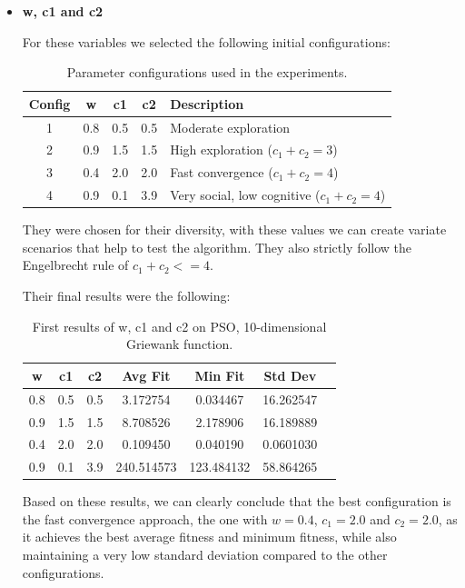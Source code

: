 \documentclass[12pt,a4paper]{article}
\begin{document}
    \begin{itemize} 
        \item \textbf{w, c1 and c2}
        
        For these variables we selected the following initial configurations:

            \begin{table}[H]
                \centering
                \begin{tabular}{c c c c l}
                \hline
                \textbf{Config} & \textbf{w} & \textbf{c1} & \textbf{c2} & \textbf{Description} \\
                \hline
                1 & 0.8 & 0.5 & 0.5 & Moderate exploration \\
                2 & 0.9 & 1.5 & 1.5 & High exploration ($c_1 + c_2 = 3$) \\
                3 & 0.4 & 2.0 & 2.0 & Fast convergence ($c_1 + c_2 = 4$) \\
                4 & 0.9 & 0.1 & 3.9 & Very social, low cognitive ($c_1 + c_2 = 4$) \\
                \hline
                \end{tabular}
                \caption{Parameter configurations used in the experiments.}
            \end{table}
        They were chosen for their diversity, with these values we can create variate scenarios that help to test the algorithm. They also strictly follow the Engelbrecht rule of $c_1 + c_2 <= 4$.

        Their final results were the following:
        \begin{table}[H]
            \centering
            \begin{tabular}{c c c c c c c}
            \hline
            \textbf{w} & \textbf{c1} & \textbf{c2} & \textbf{Avg Fit} & \textbf{Min Fit} & \textbf{Std Dev} \\
            \hline
            0.8 & 0.5 & 0.5 & 3.172754 & 0.034467 & 16.262547 \\
            0.9 & 1.5 & 1.5 & 8.708526 & 2.178906 & 16.189889 \\
             0.4 & 2.0 & 2.0 &  0.109450 & 0.040190 & 0.0601030 \\
             0.9 & 0.1 & 3.9 & 240.514573 & 123.484132 & 58.864265 \\
            \hline
            \end{tabular}
            \caption{First results of w, c1 and c2 on PSO, 10-dimensional Griewank function.}
        \end{table}
        Based on these results, we can clearly conclude that the best configuration is the fast convergence approach, the one with $w=0.4$, $c_1=2.0$ and $c_2=2.0$, as it achieves the best average fitness and minimum fitness, while also maintaining a very low standard deviation compared to the other configurations. 
        

\end{itemize}
\end{document}
